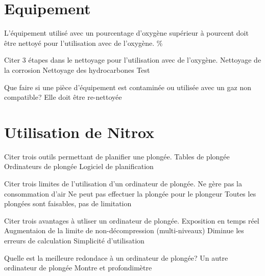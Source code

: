 \documentclass[english,12pt,a4paper]{article}
\begin{document}
	\section{Equipement}
	\begin{outline}
		\1 L'équipement utilisé avec un pourcentage d'oxygène supérieur à \underline{\hspace{1.5cm}} pourcent doit être nettoyé pour l'utilisation avec de l'oxygène.
			\%

		\1 Citer 3 étapes dans le nettoyage pour l'utilisation avec de l'oxygène.
			\2 Nettoyage de la corrosion
			\2 Nettoyage des hydrocarbones
			\2 Test

		\1 Que faire si une pièce d'équipement est contaminée ou utilisée avec un gaz non compatible?
			\2 Elle doit être re-nettoyée
	\end{outline}
	\pagebreak

	\section{Utilisation de Nitrox}
	\begin{outline}
		\1 Citer trois outils permettant de planifier une plongée.
			\2 Tables de plongée
			\2 Ordinateurs de plongée
			\2 Logiciel de planification

		\1 Citer trois limites de l'utilisation d'un ordinateur de plongée.
			\2 Ne gère pas la consommation d'air
			\2 Ne peut pas effectuer la plongée pour le plongeur
			\2 Toutes les plongées sont faisables, pas de limitation

		\1 Citer trois avantages à utliser un ordinateur de plongée.
			\2 Exposition en temps réel
			\2 Augmentaion de la limite de non-décompression (multi-niveaux)
			\2 Diminue les erreurs de calculation
			\2 Simplicité d'utilisation

		\1 Quelle est la meilleure redondace à un ordinateur de plongée?
			\2 Un autre ordinateur de plongée
			\2 Montre et profondimètre
	\end{outline}
	\pagebreak

\end{document}
